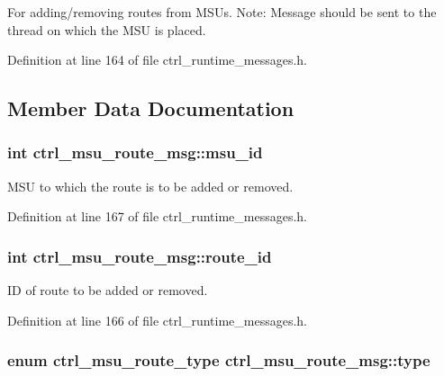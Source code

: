 For adding/removing routes from M\-S\-Us. Note\-: Message should be sent to the thread on which the M\-S\-U is placed. 

Definition at line 164 of file ctrl\-\_\-runtime\-\_\-messages.\-h.



\subsection{Member Data Documentation}
\hypertarget{structctrl__msu__route__msg_a4e29c9a68472bf6c53a719e3c4eb20ca}{
\subsubsection[{msu\-\_\-id}]{\setlength{\rightskip}{0pt plus 5cm}int ctrl\-\_\-msu\-\_\-route\-\_\-msg\-::msu\-\_\-id}}\label{structctrl__msu__route__msg_a4e29c9a68472bf6c53a719e3c4eb20ca}


M\-S\-U to which the route is to be added or removed. 



Definition at line 167 of file ctrl\-\_\-runtime\-\_\-messages.\-h.

\hypertarget{structctrl__msu__route__msg_a932e1789c351a3f9fc12686510097b5f}{
\subsubsection[{route\-\_\-id}]{\setlength{\rightskip}{0pt plus 5cm}int ctrl\-\_\-msu\-\_\-route\-\_\-msg\-::route\-\_\-id}}\label{structctrl__msu__route__msg_a932e1789c351a3f9fc12686510097b5f}


I\-D of route to be added or removed. 



Definition at line 166 of file ctrl\-\_\-runtime\-\_\-messages.\-h.

\hypertarget{structctrl__msu__route__msg_aab44678aabd93699f6fc6c3ac4342761}{
\subsubsection[{type}]{\setlength{\rightskip}{0pt plus 5cm}enum {\bf ctrl\-\_\-msu\-\_\-route\-\_\-type} ctrl\-\_\-msu\-\_\-route\-\_\-msg\-::type}}\label{structctrl__msu__route__msg_aab44678aabd93699f6fc6c3ac4342761}


